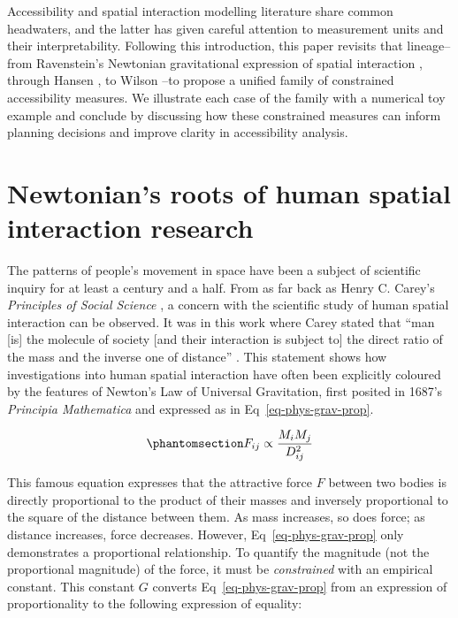 \documentclass[
  10pt,
  letterpaper,
]{article}
\begin{document}
Accessibility and spatial interaction modelling literature share common
headwaters, and the latter has given careful attention to measurement
units and their interpretability. Following this introduction, this
paper revisits that lineage--from Ravenstein's Newtonian gravitational
expression of spatial interaction \citep{ravensteinLawsMigration1889},
through Hansen \citep{hansen1959}, to Wilson \citep{wilson1971}--to
propose a unified family of constrained accessibility measures. We
illustrate each case of the family with a numerical toy example and
conclude by discussing how these constrained measures can inform
planning decisions and improve clarity in accessibility analysis.

\section{Newtonian's roots of human spatial interaction
research}\label{newtonians-roots-of-human-spatial-interaction-research}

The patterns of people's movement in space have been a subject of
scientific inquiry for at least a century and a half. From as far back
as Henry C. Carey's \emph{Principles of Social Science}
\citep{careyPrinciplesSocialScience1858}, a concern with the scientific
study of human spatial interaction can be observed. It was in this work
where Carey stated that ``man {[}is{]} the molecule of society {[}and
their interaction is subject to{]} the direct ratio of the mass and the
inverse one of distance'' \citep[pp.~37-38]{mckeanManual1883}. This
statement shows how investigations into human spatial interaction have
often been explicitly coloured by the features of Newton's Law of
Universal Gravitation, first posited in 1687's \emph{Principia
Mathematica} and expressed as in Eq~\ref{eq-phys-grav-prop}.

\begin{equation}\phantomsection\label{eq-phys-grav-prop}{
F_{ij} \propto \frac{M_i M_j} {D_{ij}^{2}}
}\end{equation}

This famous equation expresses that the attractive force \(F\) between
two bodies is directly proportional to the product of their masses and
inversely proportional to the square of the distance between them. As
mass increases, so does force; as distance increases, force decreases.
However, Eq~\ref{eq-phys-grav-prop} only demonstrates a proportional
relationship. To quantify the magnitude (not the proportional magnitude)
of the force, it must be \emph{constrained} with an empirical constant.
This constant \(G\) converts Eq~\ref{eq-phys-grav-prop} from an
expression of proportionality to the following expression of equality:
\end{document}
